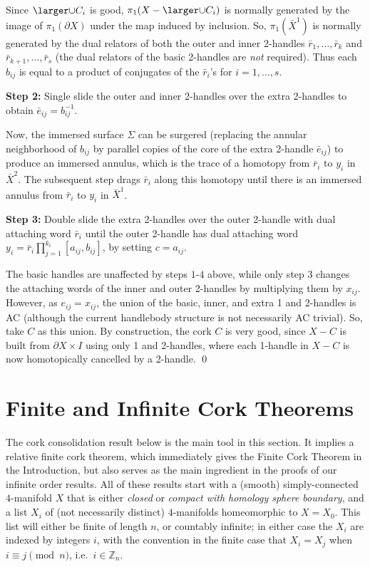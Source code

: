 \documentclass[11pt]{amsart}
\theoremstyle{definition}
\newcommand{\bz}{\mathbb Z}
\begin{document}
Since $\Q$ is good, $\pi_1(X-\Q)$ is normally generated by the image of $\pi_1(\partial X)$ under the map induced by inclusion. So, $\pi_1(\bar X^{1})$ is normally generated by the dual relators of both the outer and inner 2-handles $\bar r_1, \dots, \bar r_k$ and $\bar r_{k+1}, \dots, \bar r_s$ (the dual relators of the basic 2-handles are \emph{not} required).  Thus each $b_{ij}$ is equal to a product of conjugates of the $\bar r_i$'s for $i=1, \dots, s$.

{\bf Step 2:} Single slide the outer and inner 2-handles over the extra 2-handles to obtain $\bar e_{ij} = b_{ij}^{-1}$. 

Now, the immersed surface $\Sigma$ can be surgered (replacing the annular neighborhood of $b_{ij}$ by parallel copies of the core of the extra 2-handle $\bar e_{ij}$) to produce an immersed annulus, which is the trace of a homotopy from $\bar r_i$ to $y_i$ in $\bar X^2$. The subsequent step drags $\bar r_i$ along this homotopy until there is an immersed annulus from $\bar r_i$ to $y_i$ in $\bar X^1$. 

{\bf Step 3:} Double slide the extra 2-handles over the outer 2-handle with dual attaching word $\bar r_i$ until the outer 2-handle has dual attaching word $y_i=\bar r_i\prod_{j=1}^{k_i} [a_{ij},b_{ij}]$, by setting $c=a_{ij}$. 

The basic handles are unaffected by steps $1$-$4$ above, while only step $3$ changes the attaching words of the inner and outer 2-handles by multiplying them by $x_{ij}$. However, as $e_{ij} = x_{ij}$, the union of the basic, inner, and extra 1 and 2-handles is AC (although the current handlebody structure is not necessarily AC trivial). So, take $C$ as this union. By construction, the cork $C$ is very good, since $X-C$ is built from $\partial X \times I$ using only 1 and 2-handles, where each 1-handle in $X-C$ is now homotopically cancelled by a 2-handle. 
\qed


\section{Finite and Infinite Cork Theorems}
The cork consolidation result below is the main tool in this section.  It implies a relative finite cork theorem, which immediately gives the Finite Cork Theorem in the Introduction, but also serves as the main ingredient in the proofs of our infinite order results.  All of these results start with a (smooth) simply-connected $4$-manifold $X$ that is either {\sl closed} or {\sl compact with homology sphere boundary}, and a list $X_i$ of (not necessarily distinct) $4$-manifolds homeomorphic to $X=X_0$.  This list will either be finite of length $n$, or countably infinite; in either case the $X_i$ are indexed by integers $i$, with the convention in the finite case that $X_i = X_j$ when $i\equiv j\pmod n$, i.e.\ $i\in\bz_n$.
\end{document}
